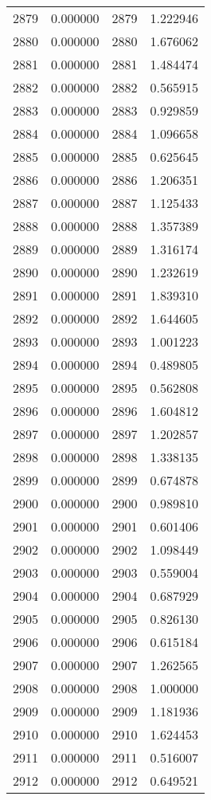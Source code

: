 \documentclass[12pt]{article}
\begin{document}
\begin{longtable}{@{}cccc@{}}
2879 & 0.000000 & 2879 & 1.222946 \\
2880 & 0.000000 & 2880 & 1.676062 \\
2881 & 0.000000 & 2881 & 1.484474 \\
2882 & 0.000000 & 2882 & 0.565915 \\
2883 & 0.000000 & 2883 & 0.929859 \\
2884 & 0.000000 & 2884 & 1.096658 \\
2885 & 0.000000 & 2885 & 0.625645 \\
2886 & 0.000000 & 2886 & 1.206351 \\
2887 & 0.000000 & 2887 & 1.125433 \\
2888 & 0.000000 & 2888 & 1.357389 \\
2889 & 0.000000 & 2889 & 1.316174 \\
2890 & 0.000000 & 2890 & 1.232619 \\
2891 & 0.000000 & 2891 & 1.839310 \\
2892 & 0.000000 & 2892 & 1.644605 \\
2893 & 0.000000 & 2893 & 1.001223 \\
2894 & 0.000000 & 2894 & 0.489805 \\
2895 & 0.000000 & 2895 & 0.562808 \\
2896 & 0.000000 & 2896 & 1.604812 \\
2897 & 0.000000 & 2897 & 1.202857 \\
2898 & 0.000000 & 2898 & 1.338135 \\
2899 & 0.000000 & 2899 & 0.674878 \\
2900 & 0.000000 & 2900 & 0.989810 \\
2901 & 0.000000 & 2901 & 0.601406 \\
2902 & 0.000000 & 2902 & 1.098449 \\
2903 & 0.000000 & 2903 & 0.559004 \\
2904 & 0.000000 & 2904 & 0.687929 \\
2905 & 0.000000 & 2905 & 0.826130 \\
2906 & 0.000000 & 2906 & 0.615184 \\
2907 & 0.000000 & 2907 & 1.262565 \\
2908 & 0.000000 & 2908 & 1.000000 \\
2909 & 0.000000 & 2909 & 1.181936 \\
2910 & 0.000000 & 2910 & 1.624453 \\
2911 & 0.000000 & 2911 & 0.516007 \\
2912 & 0.000000 & 2912 & 0.649521 \\

\end{longtable}
\end{document}
